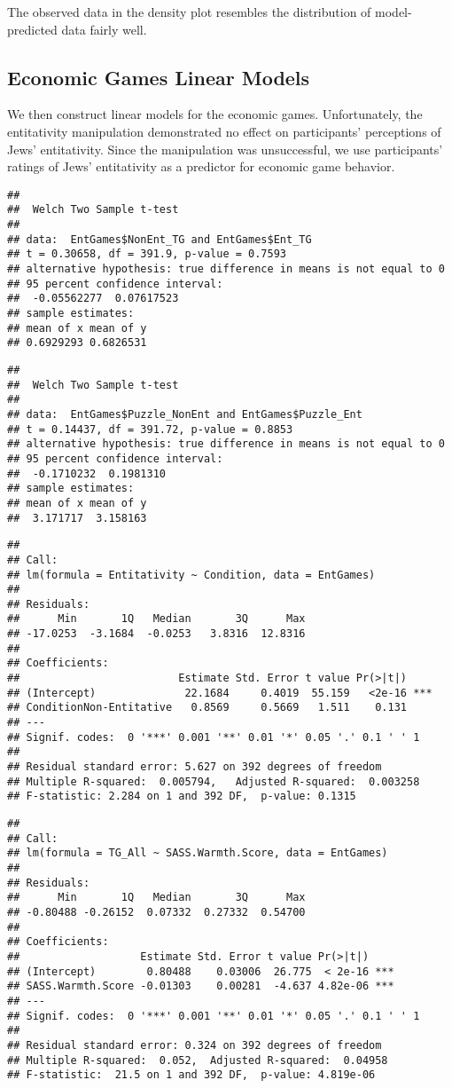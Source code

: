 \documentclass[
  doc,draftall]{apa6}
\begin{document}
The observed data in the density plot resembles the distribution of model-predicted data fairly well.

\subsection{Economic Games Linear Models}\label{economic-games-linear-models}

We then construct linear models for the economic games. Unfortunately, the entitativity manipulation demonstrated no effect on participants' perceptions of Jews' entitativity. Since the manipulation was unsuccessful, we use participants' ratings of Jews' entitativity as a predictor for economic game behavior.

\begin{verbatim}
## 
##  Welch Two Sample t-test
## 
## data:  EntGames$NonEnt_TG and EntGames$Ent_TG
## t = 0.30658, df = 391.9, p-value = 0.7593
## alternative hypothesis: true difference in means is not equal to 0
## 95 percent confidence interval:
##  -0.05562277  0.07617523
## sample estimates:
## mean of x mean of y 
## 0.6929293 0.6826531
\end{verbatim}

\begin{verbatim}
## 
##  Welch Two Sample t-test
## 
## data:  EntGames$Puzzle_NonEnt and EntGames$Puzzle_Ent
## t = 0.14437, df = 391.72, p-value = 0.8853
## alternative hypothesis: true difference in means is not equal to 0
## 95 percent confidence interval:
##  -0.1710232  0.1981310
## sample estimates:
## mean of x mean of y 
##  3.171717  3.158163
\end{verbatim}

\begin{verbatim}
## 
## Call:
## lm(formula = Entitativity ~ Condition, data = EntGames)
## 
## Residuals:
##      Min       1Q   Median       3Q      Max 
## -17.0253  -3.1684  -0.0253   3.8316  12.8316 
## 
## Coefficients:
##                         Estimate Std. Error t value Pr(>|t|)    
## (Intercept)              22.1684     0.4019  55.159   <2e-16 ***
## ConditionNon-Entitative   0.8569     0.5669   1.511    0.131    
## ---
## Signif. codes:  0 '***' 0.001 '**' 0.01 '*' 0.05 '.' 0.1 ' ' 1
## 
## Residual standard error: 5.627 on 392 degrees of freedom
## Multiple R-squared:  0.005794,   Adjusted R-squared:  0.003258 
## F-statistic: 2.284 on 1 and 392 DF,  p-value: 0.1315
\end{verbatim}

\begin{verbatim}
## 
## Call:
## lm(formula = TG_All ~ SASS.Warmth.Score, data = EntGames)
## 
## Residuals:
##      Min       1Q   Median       3Q      Max 
## -0.80488 -0.26152  0.07332  0.27332  0.54700 
## 
## Coefficients:
##                   Estimate Std. Error t value Pr(>|t|)    
## (Intercept)        0.80488    0.03006  26.775  < 2e-16 ***
## SASS.Warmth.Score -0.01303    0.00281  -4.637 4.82e-06 ***
## ---
## Signif. codes:  0 '***' 0.001 '**' 0.01 '*' 0.05 '.' 0.1 ' ' 1
## 
## Residual standard error: 0.324 on 392 degrees of freedom
## Multiple R-squared:  0.052,  Adjusted R-squared:  0.04958 
## F-statistic:  21.5 on 1 and 392 DF,  p-value: 4.819e-06
\end{verbatim}
\end{document}
